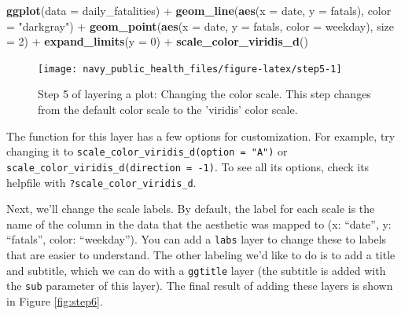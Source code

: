 \documentclass[]{tufte-book}
\newenvironment{Shaded}{}{}
\newcommand{\DataTypeTok}[1]{\textcolor[rgb]{0.56,0.13,0.00}{#1}}
\newcommand{\DecValTok}[1]{\textcolor[rgb]{0.25,0.63,0.44}{#1}}
\newcommand{\KeywordTok}[1]{\textcolor[rgb]{0.00,0.44,0.13}{\textbf{#1}}}
\newcommand{\NormalTok}[1]{#1}
\newcommand{\OperatorTok}[1]{\textcolor[rgb]{0.40,0.40,0.40}{#1}}
\newcommand{\StringTok}[1]{\textcolor[rgb]{0.25,0.44,0.63}{#1}}
\begin{document}
\begin{Shaded}
\begin{Highlighting}[]
\KeywordTok{ggplot}\NormalTok{(}\DataTypeTok{data =}\NormalTok{ daily_fatalities) }\OperatorTok{+}\StringTok{ }\KeywordTok{geom_line}\NormalTok{(}\KeywordTok{aes}\NormalTok{(}\DataTypeTok{x =}\NormalTok{ date, }
    \DataTypeTok{y =}\NormalTok{ fatals), }\DataTypeTok{color =} \StringTok{"darkgray"}\NormalTok{) }\OperatorTok{+}\StringTok{ }\KeywordTok{geom_point}\NormalTok{(}\KeywordTok{aes}\NormalTok{(}\DataTypeTok{x =}\NormalTok{ date, }
    \DataTypeTok{y =}\NormalTok{ fatals, }\DataTypeTok{color =}\NormalTok{ weekday), }\DataTypeTok{size =} \DecValTok{2}\NormalTok{) }\OperatorTok{+}\StringTok{ }
\StringTok{    }\KeywordTok{expand_limits}\NormalTok{(}\DataTypeTok{y =} \DecValTok{0}\NormalTok{) }\OperatorTok{+}\StringTok{ }\KeywordTok{scale_color_viridis_d}\NormalTok{()}
\end{Highlighting}
\end{Shaded}

\begin{figure}
\texttt{[image: navy\_public\_health\_files/figure-latex/step5-1]} \caption[Step 5 of layering a plot]{Step 5 of layering a plot: Changing the color scale. This step changes from the default color scale to the 'viridis' color scale.}\label{fig:step5}
\end{figure}

The function for this layer has a few options for customization. For example, try
changing it to \texttt{scale\_color\_viridis\_d(option\ =\ "A")} or
\texttt{scale\_color\_viridis\_d(direction\ =\ -1)}. To see all its options, check its
helpfile with \texttt{?scale\_color\_viridis\_d}.

Next, we'll change the scale labels. By default, the label for each scale is the
name of the column in the data that the aesthetic was mapped to (x: ``date'',
y: ``fatals'', color: ``weekday''). You can add a \texttt{labs} layer to change these
to labels that are easier to understand. The other
labeling we'd like to do is to add a title and subtitle, which we can do with
a \texttt{ggtitle} layer (the subtitle is added with the \texttt{sub} parameter of this layer).
The final result of adding these layers is shown in Figure \ref{fig:step6}.
\end{document}

